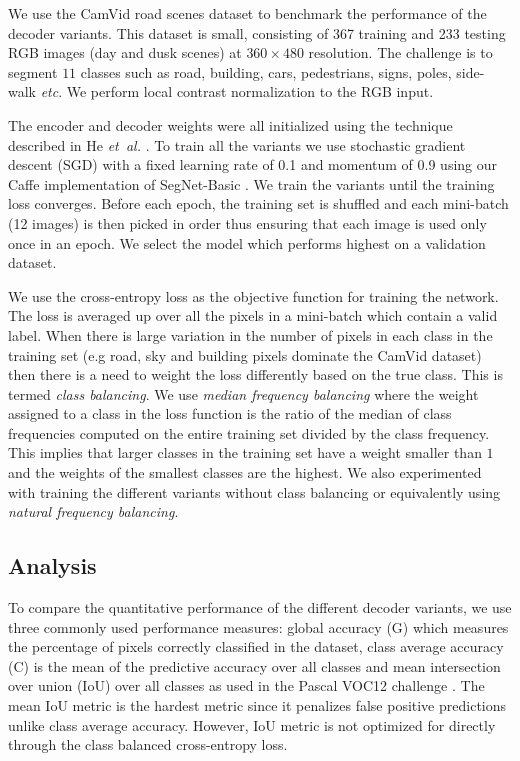 We use the CamVid road scenes dataset to benchmark the performance of the decoder variants. This dataset is small, consisting of 367 training and 233 testing RGB images (day and dusk scenes) at $360\times480$ resolution. The challenge is to segment $11$ classes such as road, building, cars, pedestrians, signs, poles, side-walk \textit{etc}. We perform local contrast normalization \citep{Jarrett} to the RGB input.

The encoder and decoder weights were all initialized using the technique described in He \emph{et~al.} \citep{he2015delving}. To train all the variants we use stochastic gradient descent (SGD) with a fixed learning rate of 0.1 and momentum of 0.9 \citep{Bottou} using our Caffe implementation of SegNet-Basic \citep{jia2014caffe}. We train the variants until the training loss converges. Before each epoch, the training set is shuffled and each mini-batch (12 images) is then picked in order thus ensuring that each image is used only once in an epoch. We select the model which performs highest on a validation dataset.

We use the cross-entropy loss \citep{long2015fully} as the objective function for training the network. The loss is averaged up over all the pixels in a mini-batch which contain a valid label. When there is large variation in the number of pixels in each class in the training set (e.g road, sky and building pixels dominate the CamVid dataset) then there is a need to weight the loss differently based on the true class. This is termed \textit{class balancing}. We use \textit{median frequency balancing} \citep{eigen2015predicting} where the weight assigned to a class in the loss function is the ratio of the median of class frequencies computed on the entire training set divided by the class frequency. This implies that larger classes in the training set have a weight smaller than $1$ and the weights of the smallest classes are the highest. We also experimented with training the different variants without class balancing or equivalently using \textit{natural frequency balancing}.

\subsection{Analysis}
\label{Analysis}
To compare the quantitative performance of the different decoder variants, we use three commonly used performance measures: global accuracy (G) which measures the percentage of pixels correctly classified in the dataset, class average accuracy (C) is the mean of the predictive accuracy over all classes and mean intersection over union (IoU) over all classes as used in the Pascal VOC12 challenge \citep{pascal}. The mean IoU metric is the hardest metric since it penalizes false positive predictions unlike class average accuracy. However, IoU metric is not optimized for directly through the class balanced cross-entropy loss. 

